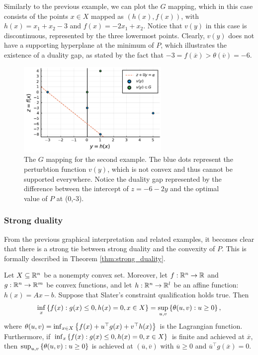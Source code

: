 Similarly to the previous example, we can plot the $G$ mapping, which in this case consists of the points $x \in X$ mapped as $(h(x), f(x))$, with $h(x) = x_1 + x_2 - 3$ and $f(x) = -2x_1 + x_2$. Notice that $v(y)$ in this case is discontinuous, represented by the three lowermost points. Clearly, $v(y)$ does not have a supporting hyperplane at the minimum of $P$, which illustrates the existence of a duality gap, as stated by the fact that $-3 = f(\overline{x}) > \theta(\overline{v}) = -6$. 


\begin{figure}
	\includegraphics[width=0.65\textwidth]{part_2/chapter_8/figures/ex2_3.pdf}
	\caption{The $G$ mapping for the second example. The blue dots represent the perturbtion function $v(y)$, which is not convex and thus cannot be supported everywhere. Notice the duality gap represented by the difference between the intercept of $z = -6 -2y$ and the optimal value of $P$ at (0,-3).}
\end{figure}
	


\subsubsection{Strong duality}

From the previous graphical interpretation and related examples, it becomes clear that there is a strong tie between strong duality and the convexity of $P$. This is formally described in Theorem \ref{thm:strong_duality}.

\begin{theorem} \label{thm:strong_duality}
	Let $X \subseteq \mathbb{R}^n$ be a nonempty convex set. Moreover, let $f: \mathbb{R}^n \rightarrow \mathbb{R}$ and $g: \mathbb{R}^n \rightarrow \mathbb{R}^m$ be convex functions, and let $h: \mathbb{R}^n \rightarrow \mathbb{R}^l$ be an affine function: $h(x) = Ax - b$. Suppose that Slater's constraint qualification holds true. Then 
	$$ \inf_{x} \left\{ f(x) : g(x) \leq 0, h(x) = 0, x \in X \right \} = \sup_{u,v}\left\{ \theta(u,v) : u \geq 0 \right \},
	$$ 
	where $\theta(u,v) = \inf_{x \in X} \left\{ f(x) + u^\top g(x) + v^\top h(x) \right \}$ is the Lagrangian function. Furthermore, if $\inf_x \left\{ f(x) : g(x) \leq 0, h(x) = 0, x \in X \right \}$ is finite and achieved at $\overline{x}$, then \lb $ \sup_{u,v}\left\{ \theta(u,v) : u \geq 0 \right \}$ is achieved at $(\overline{u},\overline{v})$ with $\overline{u} \geq 0$ and $\overline{u}^\top g(\overline{x}) = 0$.
\end{theorem}


